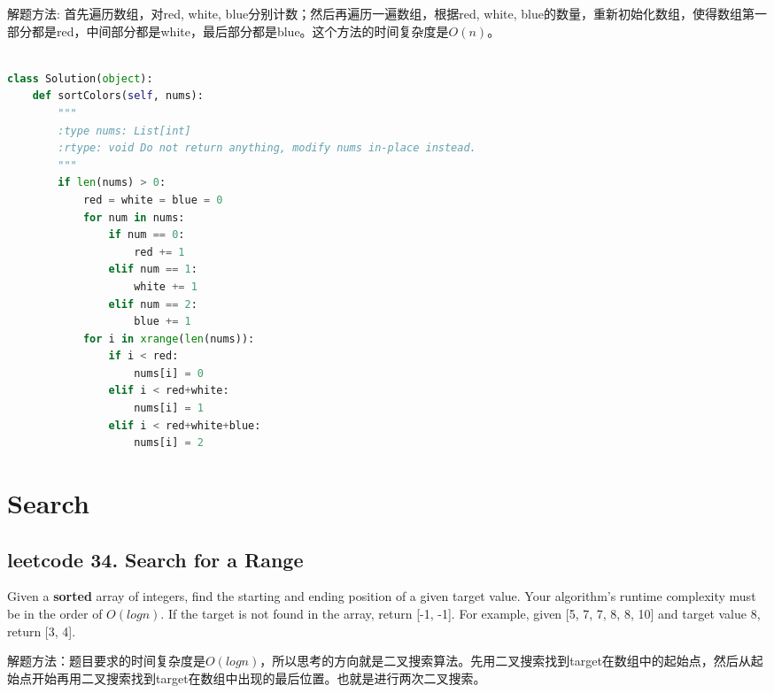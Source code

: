 \documentclass[a4paper,10pt]{article}
\begin{document}
\begin{CJK*}{UTF8}{gbsn}
\noindent 解题方法: 首先遍历数组，对red, white, blue分别计数；然后再遍历一遍数组，根据red, white, blue的数量，重新初始化数组，使得数组第一部分都是red，中间部分都是white，最后部分都是blue。这个方法的时间复杂度是$O(n)$。\\
\end{CJK*}

\begin{lstlisting}[language=Python, caption=Problem75. Sort Colors]

class Solution(object):
    def sortColors(self, nums):
        """
        :type nums: List[int]
        :rtype: void Do not return anything, modify nums in-place instead.
        """
        if len(nums) > 0:
            red = white = blue = 0
            for num in nums:
                if num == 0:
                    red += 1
                elif num == 1:
                    white += 1
                elif num == 2:
                    blue += 1
            for i in xrange(len(nums)):
                if i < red:
                    nums[i] = 0
                elif i < red+white:
                    nums[i] = 1
                elif i < red+white+blue:
                    nums[i] = 2
\end{lstlisting}








\section{Search}
\subsection{leetcode 34. Search for a Range}
Given a \textbf{sorted} array of integers, find the starting and ending position of a given target value. Your algorithm's runtime complexity must be in the order of $O(logn)$. If the target is not found in the array, return [-1, -1]. For example, given [5, 7, 7, 8, 8, 10] and target value 8, return [3, 4]. \\

\begin{CJK*}{UTF8}{gbsn}
\noindent 解题方法：题目要求的时间复杂度是$O(logn)$，所以思考的方向就是二叉搜索算法。先用二叉搜索找到target在数组中的起始点，然后从起始点开始再用二叉搜索找到target在数组中出现的最后位置。也就是进行两次二叉搜索。\\
\end{CJK*}
\end{document}
